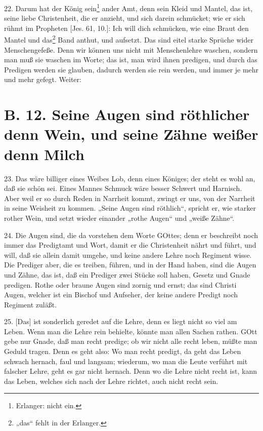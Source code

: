 22. Darum hat der König sein\footnote{Erlanger: nicht ein.} ander Amt, denn sein Kleid und Mantel, das ist, seine liebe Christenheit, die er anzieht, und sich darein schmücket; wie er sich rühmt im Propheten [Jes. 61, 10.]: Ich will dich schmücken, wie eine Braut den Mantel und das\footnote{„das“ fehlt in der Erlanger.} Band anthut, und aufsetzt. Das sind eitel starke Sprüche wider Menschengefeße. Denn wir können uns nicht mit Menschenlehre waschen, sondern man muß sie waschen im Worte; das ist, man wird ihnen predigen, und durch das Predigen werden sie glauben, dadurch werden sie rein werden, und immer je mehr und mehr gefegt. Weiter:

\section[B. 12. Seine Augen sind röthlicher denn Wein,]{B. 12. Seine Augen sind röthlicher denn Wein, und seine Zähne weißer denn Milch}

23. Das wäre billiger eines Weibes Lob, denn eines Königes; der steht es wohl an, daß sie schön sei. Eines Mannes Schmuck wäre besser Schwert und Harnisch. Aber weil er so durch Reden in Narrheit kommt, zwingt er uns, von der Narrheit in seine Weisheit zu kommen. „Seine Augen sind röthlich“, spricht er, wie starker rother Wein, und setzt wieder einander „rothe Augen“ und „weiße Zähne“.

24. Die Augen sind, die da vorstehen dem Worte GOttes; denn er beschreibt noch immer das Predigtamt und Wort, damit er die Christenheit nährt und führt, und will, daß sie allein damit umgehe, und keine andere Lehre noch Regiment wisse. Die Prediger aber, die es treiben, führen, und in der Hand haben, sind die Augen und Zähne, das ist, daß ein Prediger zwei Stücke soll haben, Gesetz und Gnade predigen. Rothe oder braune Augen sind zornig und ernst; das sind Christi Augen, welcher ist ein Bischof und Aufseher, der keine andere Predigt noch Regiment zuläßt.

25. [Das] ist sonderlich geredet auf die Lehre, denn es liegt nicht so viel am Leben. Wenn man die Lehre rein behielte, könnte man allen Sachen rathen. GOtt gebe nur Gnade, daß man recht predige; ob wir nicht alle recht leben, müßte man Geduld tragen. Denn es geht also: Wo man recht predigt, da geht das Leben schwach hernach, faul und langsam; wiederum, wo man die Leute verführt mit falscher Lehre, geht es gar nicht hernach. Denn wo die Lehre nicht recht ist, kann das Leben, welches sich nach der Lehre richtet, auch nicht recht sein.

